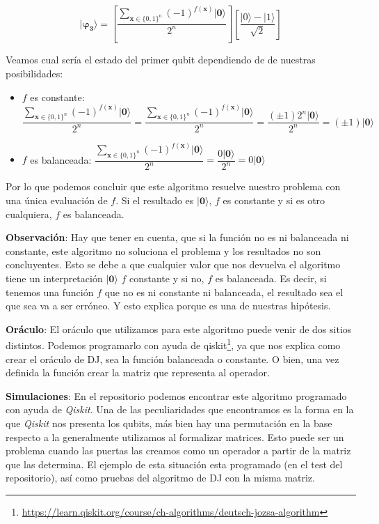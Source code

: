  \begin{equation}
     \mathbf{|\varphi_{3}\rangle}=\left[ \dfrac{\sum_{\mathbf{x} \in \{0,1\}^{n}}(-1)^{f(\mathbf{x})}|\mathbf{0}\rangle}{2^{n}}\right] \left[ \dfrac{|0\rangle - |1\rangle}{\sqrt{2}}\right]
 \end{equation}

 Veamos cual sería el estado del primer qubit dependiendo de de nuestras posibilidades:

 \begin{itemize}
     \item $f$ es constante:  $\dfrac{\sum_{\mathbf{x} \in \{0,1\}^{n}}(-1)^{f(\mathbf{x})}|\mathbf{0}\rangle}{2^{n}}=\dfrac{\sum_{\mathbf{x} \in \{0,1\}^{n}}(-1)^{f(\mathbf{x})}|\mathbf{0}\rangle}{2^{n}}=\dfrac{(\pm1)2^{n}|\mathbf{0}\rangle}{2^{n}}=(\pm1)|\mathbf{0}\rangle$

     \item $f$ es balanceada: 
     $\dfrac{\sum_{\mathbf{x} \in \{0,1\}^{n}}(-1)^{f(\mathbf{x})}|\mathbf{0}\rangle}{2^{n}}=\dfrac{0|\mathbf{0}\rangle}{2^{n}}=0|\mathbf{0}\rangle$
 \end{itemize}

 Por lo que podemos concluir que este algoritmo resuelve nuestro problema con una única evaluación de $f$. Si el resultado es $|\mathbf{0}\rangle$, $f$ es constante y si es otro cualquiera, $f$ es balanceada. \newline

 \textbf{Observación}: Hay que tener en cuenta, que si la función no es ni balanceada ni constante, este algoritmo no soluciona el problema y los resultados no son concluyentes. Esto se debe a que cualquier valor que nos devuelva el algoritmo tiene un interpretación $|\textbf{0}\rangle$ $f$ constante y si no, $f$ es balanceada. Es decir, si tenemos una función $f$ que no es ni constante ni balanceada, el resultado sea el que sea va a ser erróneo. Y esto explica porque es una de nuestras hipótesis. \newline

\textbf{Oráculo}: El oráculo que utilizamos para este algoritmo puede venir de dos sitios distintos. Podemos programarlo con ayuda de qiskit\footnote{\url{https://learn.qiskit.org/course/ch-algorithms/deutsch-jozsa-algorithm}}, ya que nos explica como crear el oráculo de DJ, sea la función balanceada o constante. O bien, una vez definida la función crear la matriz que representa al operador.\newline
 
\textbf{Simulaciones}: En el repositorio podemos encontrar este algoritmo programado con ayuda de \textit{Qiskit}. Una de las peculiaridades que encontramos es la forma en la que \textit{Qiskit} nos presenta los qubits, más bien hay una permutación en la base respecto a la generalmente utilizamos al formalizar matrices. Esto puede ser un problema cuando las puertas las creamos como un operador a partir de la matriz que las determina. El ejemplo de esta situación esta programado (en el test del repositorio), así como pruebas del algoritmo de DJ con la misma matriz. \newline

